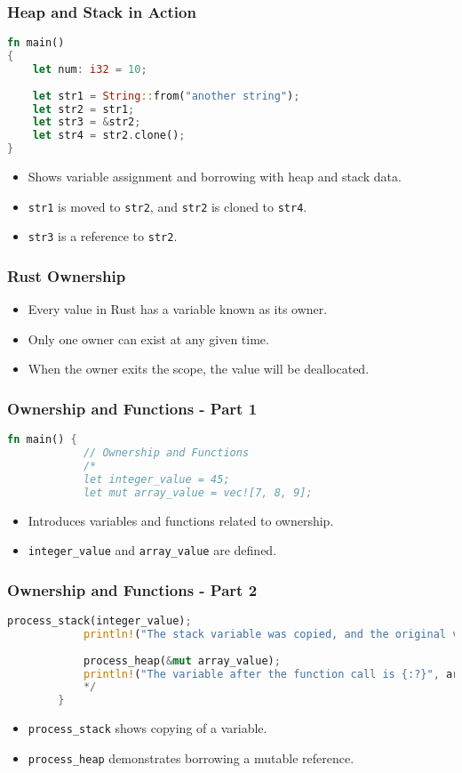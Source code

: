 \documentclass[aspectratio=169, table]{beamer}
\begin{document}
\begin{frame}[fragile]
\frametitle{Heap and Stack in Action}
\begin{lstlisting}[language=Rust]
fn main() 
{
	let num: i32 = 10; 
	
	let str1 = String::from("another string");  
	let str2 = str1; 
	let str3 = &str2; 
	let str4 = str2.clone(); 
}
\end{lstlisting}
\begin{itemize}
\item Shows variable assignment and borrowing with heap and stack data.
\item \texttt{str1} is moved to \texttt{str2}, and \texttt{str2} is cloned to \texttt{str4}.
\item \texttt{str3} is a reference to \texttt{str2}.
\end{itemize}
\end{frame}

\begin{frame}[fragile]
\frametitle{Rust Ownership}
\begin{itemize}
\item Every value in Rust has a variable known as its owner.
\item Only one owner can exist at any given time.
\item When the owner exits the scope, the value will be deallocated.
\end{itemize}
\end{frame}

\begin{frame}[fragile]
	\frametitle{Ownership and Functions - Part 1}
	\begin{lstlisting}[language=Rust]
		fn main() { 
			// Ownership and Functions
			/*
			let integer_value = 45;  
			let mut array_value = vec![7, 8, 9]; 
		\end{lstlisting}
		\begin{itemize}
			\item Introduces variables and functions related to ownership.
			\item \texttt{integer\_value} and \texttt{array\_value} are defined.
		\end{itemize}
	\end{frame}
	
	\begin{frame}[fragile]
		\frametitle{Ownership and Functions - Part 2}
		\begin{lstlisting}[language=Rust]
			process_stack(integer_value); 
			println!("The stack variable was copied, and the original value was {}", integer_value);
			
			process_heap(&mut array_value);  
			println!("The variable after the function call is {:?}", array_value);  
			*/ 
		}
	\end{lstlisting}
	\begin{itemize}
		\item \texttt{process\_stack} shows copying of a variable.
		\item \texttt{process\_heap} demonstrates borrowing a mutable reference.
	\end{itemize}
\end{frame}
\end{document}
